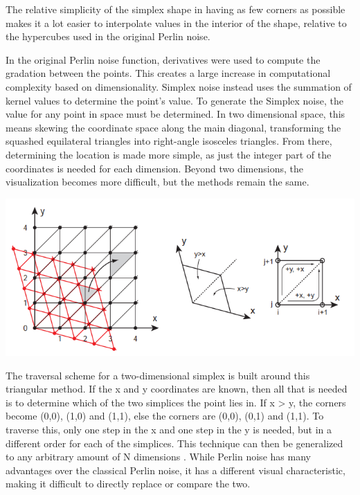 \documentclass[10pt]{report}
\begin{document}
		The relative simplicity of the simplex shape in having as few corners as possible makes it a lot easier to interpolate values in the interior of the shape, relative to the hypercubes used in the original Perlin noise.
		
		In the original Perlin noise function, derivatives were used to compute the gradation between the points. This creates a large increase in computational complexity based on dimensionality. Simplex noise instead uses the summation of kernel values to determine the point's value. To generate the Simplex noise, the value for any point in space must be determined. In two dimensional space, this means skewing the coordinate space along the main diagonal, transforming the squashed equilateral triangles into right-angle isosceles triangles. From there, determining the location is made more simple, as just the integer part of the coordinates is needed for each dimension. Beyond two dimensions, the visualization becomes more difficult, but the methods remain the same.  
		
		\begin{minipage}{\textwidth}
			\centering
			\includegraphics[scale=.5]{skewed grid}
			\label{fig:fig9}
		\end{minipage}
		
		The traversal scheme for a two-dimensional simplex is built around this triangular method. If the x and y coordinates are known, then all that is needed is to determine which of the two simplices the point lies in. If x > y, the corners become (0,0), (1,0) and (1,1), else the corners are (0,0), (0,1) and (1,1). To traverse this, only one step in the x and one step in the y is needed, but in a different order for each of the simplices. This technique can then be generalized to any arbitrary amount of N dimensions \cite{simplex-demyst}. While Perlin noise has many advantages over the classical Perlin noise, it has a different visual characteristic, making it difficult to directly replace or compare the two. 
		
\end{document}
